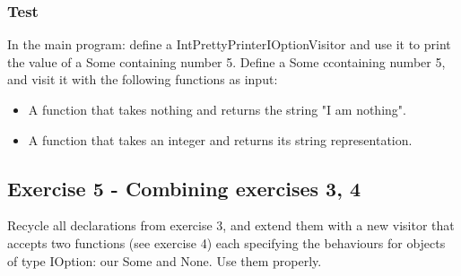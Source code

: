 \subsubsection{Test}
In the main program: define a IntPrettyPrinterIOptionVisitor and use it to print the value of a Some containing number 5.
Define a Some ccontaining number 5, and visit it with the following functions as input:
\begin{itemize}
    \item A function that takes nothing and returns the string "I am nothing".
    \item A function that takes an integer and returns its string representation.
\end{itemize}

\subsection{Exercise 5 - Combining exercises 3, 4}
Recycle all declarations from exercise 3, and extend them with a new visitor that accepts two functions (see exercise 4) each specifying the behaviours for objects of type IOption: our Some and None. Use them properly.